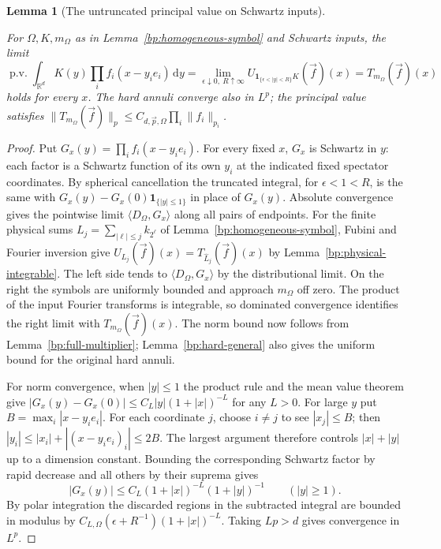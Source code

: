 \documentclass[11pt,letterpaper]{article}
\newtheorem{lemma}[theorem]{Lemma}
\theoremstyle{definition}
\newcommand{\R}{\mathbb R}
\newcommand{\ind}{\mathbf1}
\newcommand{\dd}{\,\mathrm d}
\providecommand{\lean}[1]{}
\providecommand{\uses}[1]{}
\begin{document}
\begin{lemma}[The untruncated principal value on Schwartz inputs]
\label{bp:hard-homogeneous}
\lean{TwistedParaproduct.hardHomogeneous}
For \(\Omega,K,m_\Omega\) as in Lemma~\ref{bp:homogeneous-symbol}
and Schwartz inputs, the limit
\[
 \operatorname{p.v.}\int_{\R^d}
  K(y)\prod_i f_i(x-y_i e_i)\dd y
 =\lim_{\epsilon\downarrow0,\ R\uparrow\infty}
     U_{\ind_{\{\epsilon<|y|<R\}}K}(\vec f)(x)
 =T_{m_\Omega}(\vec f)(x)
\]
holds for every \(x\). The hard annuli converge also in \(L^p\);
the principal value satisfies
\(\|T_{m_\Omega}(\vec f)\|_p\le
C_{d,\vec p,\Omega}\prod_i\|f_i\|_{p_i}\).
\end{lemma}
\begin{proof}
\uses{bp:homogeneous-symbol,bp:physical-integrable,bp:full-multiplier,bp:hard-general,bp:schwartz-Fourier}
Put \(G_x(y)=\prod_i f_i(x-y_i e_i)\). For every fixed \(x\),
\(G_x\) is Schwartz in \(y\): each factor is a Schwartz function
of its own \(y_i\) at the indicated fixed spectator coordinates.
By spherical cancellation the truncated integral, for
\(\epsilon<1<R\), is the same with
\(G_x(y)-G_x(0)\ind_{\{|y|\le1\}}\) in place of \(G_x(y)\).
Absolute convergence gives the pointwise limit
\(\langle D_\Omega,G_x\rangle\) along all pairs of endpoints.
For the finite physical sums \(L_j=\sum_{|\ell|\le j}k_{2^\ell}\)
of Lemma~\ref{bp:homogeneous-symbol}, Fubini and Fourier inversion
give \(U_{L_j}(\vec f)(x)=T_{\widehat L_j}(\vec f)(x)\) by
Lemma~\ref{bp:physical-integrable}. The left side tends to
\(\langle D_\Omega,G_x\rangle\) by the distributional limit.
On the right the symbols are uniformly bounded and approach
\(m_\Omega\) off zero. The product of the input Fourier transforms
is integrable, so dominated convergence identifies the right limit
with \(T_{m_\Omega}(\vec f)(x)\). The norm bound now follows from
Lemma~\ref{bp:full-multiplier}; Lemma~\ref{bp:hard-general} also
gives the uniform bound for the original hard annuli.

For norm convergence, when \(|y|\le1\) the product rule and the
mean value theorem give
\(|G_x(y)-G_x(0)|\le C_L |y|(1+|x|)^{-L}\) for any \(L>0\).
For large \(y\) put \(B=\max_i|x-y_i e_i|\). For each coordinate
\(j\), choose \(i\ne j\) to see \(|x_j|\le B\); then
\(|y_i|\le|x_i|+|(x-y_i e_i)_i|\le2B\).
The largest argument therefore controls \(|x|+|y|\) up to a
dimension constant. Bounding the corresponding Schwartz factor by
rapid decrease and all others by their suprema gives
\[
 |G_x(y)|\le C_L(1+|x|)^{-L}(1+|y|)^{-1}
 \qquad (|y|\ge1).
\]
By polar integration the discarded regions in the subtracted integral
are bounded in modulus by \(C_{L,\Omega}(\epsilon+R^{-1})(1+|x|)^{-L}\).
Taking \(Lp>d\) gives convergence in \(L^p\).
\end{proof}
\end{document}
